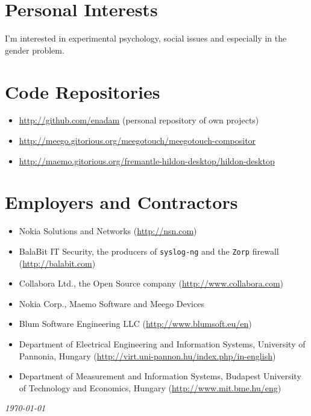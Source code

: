 \documentclass[a4paper,12pt]{article}
\newcommand{\compress}{\setlength\itemsep{-\parskip}}
\begin{document}
\section{Personal Interests}

I'm interested in experimental psychology, social issues and especially
in the gender problem.

\section{Code Repositories}

\begin{itemize}\compress
\item	\url{http://github.com/enadam} (personal repository of own projects)
\item	\url{http://meego.gitorious.org/meegotouch/meegotouch-compositor}
\item	\url{http://maemo.gitorious.org/fremantle-hildon-desktop/hildon-desktop}
\end{itemize}

\section{Employers and Contractors}

\begin{itemize}\compress
\item	Nokia Solutions and Networks (\url{http://nsn.com})
\item	BalaBit IT Security, the producers of \texttt{syslog-ng}
	and the \texttt{Zorp} firewall (\url{http://balabit.com})
\item	Collabora Ltd., the Open Source company (\url{http://www.collabora.com})
\item	Nokia Corp., Maemo Software and Meego Devices
\item	Blum Software Engineering LLC (\url{http://www.blumsoft.eu/en})
\item	Department of Electrical Engineering and Information Systems,
	University of Pannonia, Hungary
	(\url{http://virt.uni-pannon.hu/index.php/in-english})
\item	Department of Measurement and Information Systems,
	Budapest University of Technology and Economics, Hungary
	(\url{http://www.mit.bme.hu/eng})
\end{itemize}

\center\itshape\today
\end{document}
